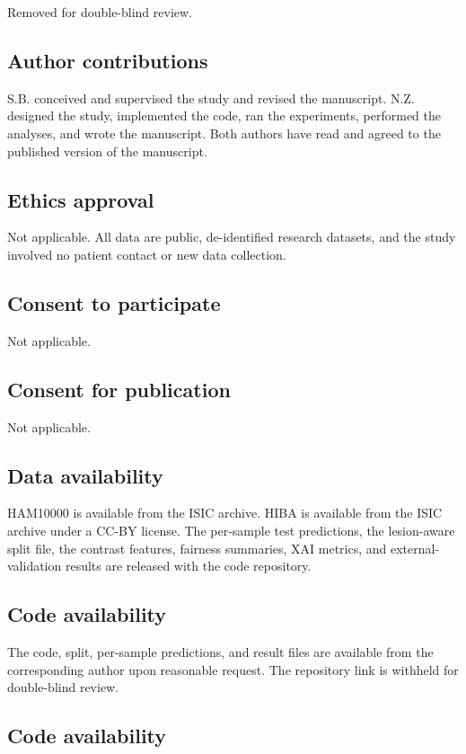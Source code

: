 \documentclass[11pt]{article}
\begin{document}
Removed for double-blind review.
\else
\subsection*{Author contributions}

S.B. conceived and supervised the study and revised the manuscript. N.Z. designed the study, implemented the code, ran the experiments, performed the analyses, and wrote the manuscript. Both authors have read and agreed to the published version of the manuscript.
\fi

\subsection*{Ethics approval}

Not applicable. All data are public, de-identified research datasets, and the study involved no patient contact or new data collection.

\subsection*{Consent to participate}

Not applicable.

\subsection*{Consent for publication}

Not applicable.

\subsection*{Data availability}

HAM10000 is available from the ISIC archive. HIBA is available from the ISIC archive under a CC-BY license. The per-sample test predictions, the lesion-aware split file, the contrast features, fairness summaries, XAI metrics, and external-validation results are released with the code repository.

\ifdefined\blindmode
\subsection*{Code availability}

The code, split, per-sample predictions, and result files are available from the corresponding author upon reasonable request. The repository link is withheld for double-blind review.
\else
\subsection*{Code availability}
\end{document}
